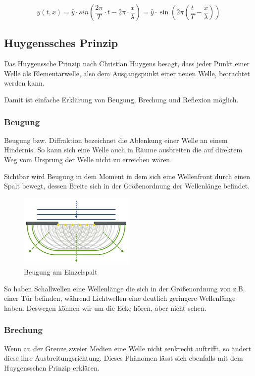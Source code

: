 \documentclass[a4paper]{article}
\begin{document}
			\begin{equation}
				y(t, x)=\hat{y}\cdot sin\left(\frac{2\pi}{T}\cdot t - 2\pi\cdot \frac{x}{\lambda}\right) = \hat{y}\cdot\sin\left(2\pi\left(\frac{t}{T}-\frac{x}{\lambda} \right)\right)
			\end{equation}
			
			
		\subsection{Huygenssches Prinzip}
			Das Huygenssche Prinzip nach Christian Huygens besagt, dass jeder Punkt einer Welle als Elementarwelle, also dem Ausgangspunkt einer neuen Welle, betrachtet werden kann.
			
			\noindent Damit ist einfache Erklärung von Beugung, Brechung und Reflexion möglich.
			
				\subsubsection{Beugung}
					Beugung bzw. Diffraktion bezeichnet die Ablenkung einer Welle an einem Hindernis. So kann sich eine Welle auch in Räume ausbreiten die auf direktem Weg vom Ursprung der Welle nicht zu erreichen wären.
					
					\noindent Sichtbar wird Beugung in dem Moment in dem sich eine Wellenfront durch einen Spalt bewegt, dessen Breite sich in der Größenordnung der Wellenlänge befindet. 
					
					\begin{figure}[H]
						\centering
						\includegraphics[width=0.5\textwidth]{img/beugung.png}
						\caption{Beugung am Einzelspalt}
						\label{img:beugung}
					\end{figure}
					
					\noindent So haben Schallwellen eine Wellenlänge die sich in der Größenordnung von z.B. einer Tür befinden, während Lichtwellen eine deutlich geringere Wellenlänge haben. Deswegen können wir um die Ecke hören, aber nicht sehen.
					
				\subsubsection{Brechung}
					Wenn an der Grenze zweier Medien eine Welle nicht senkrecht auftrifft, so ändert diese ihre Ausbreitungsrichtung. Dieses Phänomen lässt sich ebenfalls mit dem Huygensschen Prinzip erklären.
					
\end{document}
